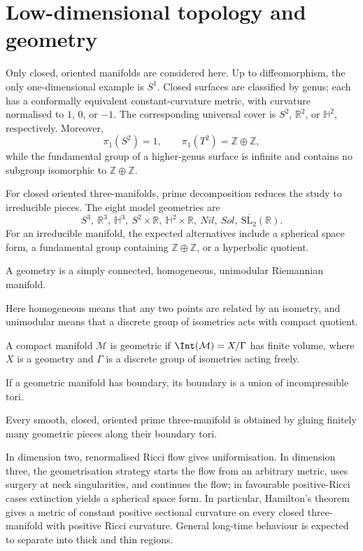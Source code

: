 \section{Low-dimensional topology and geometry}

Only closed, oriented manifolds are considered here. Up to diffeomorphism, the
only one-dimensional example is $S^1$. Closed surfaces are classified by genus;
each has a conformally equivalent constant-curvature metric, with curvature
normalised to $1$, $0$, or $-1$. The corresponding universal cover is
$S^2$, $\mathbb R^2$, or $\mathbb H^2$, respectively. Moreover,
\[
\pi_1(S^2)=1,
\qquad
\pi_1(T^2)=\mathbb Z\oplus\mathbb Z,
\]
while the fundamental group of a higher-genus surface is infinite and contains
no subgroup isomorphic to $\mathbb Z\oplus\mathbb Z$.

For closed oriented three-manifolds, prime decomposition reduces the study to
irreducible pieces. The eight model geometries are
\[
S^3,\ \mathbb R^3,\ \mathbb H^3,\ S^2\times\mathbb R,
\ \mathbb H^2\times\mathbb R,\ Nil,\ Sol,
\ \overline{\mathrm{SL}_2}(\mathbb R).
\]
For an irreducible manifold, the expected alternatives include a spherical
space form, a fundamental group containing $\mathbb Z\oplus\mathbb Z$, or a
hyperbolic quotient.

\begin{definition}
\label{topping-intro-geometry}
A geometry is a simply connected, homogeneous, unimodular Riemannian
manifold.
\end{definition}

Here homogeneous means that any two points are related by an isometry, and
unimodular means that a discrete group of isometries acts with compact
quotient.

\begin{definition}
\label{topping-intro-geometric-manifold}
A compact manifold $\mathcal M$ is geometric if
$\Int(\mathcal M)=X/\Gamma$ has finite volume, where $X$ is a geometry and
$\Gamma$ is a discrete group of isometries acting freely.
\end{definition}

If a geometric manifold has boundary, its boundary is a union of
incompressible tori.

\begin{conjecture}
\label{topping-intro-thurston-geometrization}
Every smooth, closed, oriented prime three-manifold is obtained by gluing
finitely many geometric pieces along their boundary tori.
\end{conjecture}

In dimension two, renormalised Ricci flow gives uniformisation. In dimension
three, the geometrisation strategy starts the flow from an arbitrary metric,
uses surgery at neck singularities, and continues the flow; in favourable
positive-Ricci cases extinction yields a spherical space form. In particular,
Hamilton's theorem gives a metric of constant positive sectional curvature on
every closed three-manifold with positive Ricci curvature. General long-time
behaviour is expected to separate into thick and thin regions.
